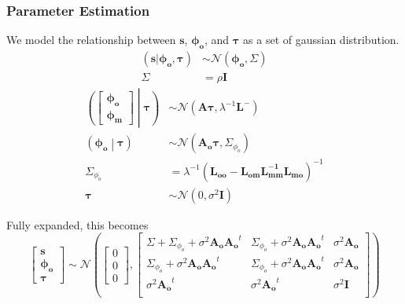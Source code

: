 \subsubsection{Parameter Estimation}
        We model the relationship between $\mathbf{s}$, $\mathbf{\phi_o}$, and
    $\mathbf{\tau}$ as a set of gaussian distribution.
    \begin{align}
        \left(\mathbf{s}|\mathbf{\phi_o}, \mathbf{\tau}\right) &\sim
            \mathcal{N}(\mathbf{\phi_o}, \Sigma)\\
        \Sigma &= \rho\mathbf{I}
    \end{align}
    \begin{align}
        \left(\begin{bmatrix}
            \mathbf{\phi_o}\\
            \mathbf{\phi_m}
        \end{bmatrix}\middle|\mathbf{\tau}\right) &\sim
            \mathcal{N}(\mathbf{A\tau}, \lambda^{-1}\mathbf{L}^-)\\
        \left(\mathbf{\phi_o}\middle|\mathbf{\tau}\right) &\sim
            \mathcal{N}\left(\mathbf{A_o}\mathbf{\tau}, \Sigma_{\phi_o}\right)\\
        \Sigma_{\phi_o} &= \lambda^{-1}\left(
            \mathbf{L_{oo}} - \mathbf{L_{om}L_{mm}^{-1}L_{mo}}\right)^{-1}\\
        \mathbf{\tau} &\sim \mathcal{N}\left(0, \sigma^2\mathbf{I}\right)
    \end{align}

    \noindent Fully expanded, this becomes
    \begin{equation}
        \begin{bmatrix}
            \mathbf{s}\\
            \mathbf{\phi_o}\\
            \mathbf{\tau}
        \end{bmatrix} \sim \mathcal{N}\left(
            \begin{bmatrix}0\\0\\0\end{bmatrix},
            \begin{bmatrix}
                \Sigma + \Sigma_{\phi_o} + \sigma^2\mathbf{A_oA_o}^t &
                \Sigma_{\phi_o} + \sigma^2\mathbf{A_oA_o}^t &
                \sigma^2\mathbf{A_o}\\
                \Sigma_{\phi_o} + \sigma^2\mathbf{A_oA_o}^t &
                \Sigma_{\phi_o} + \sigma^2\mathbf{A_oA_o}^t &
                \sigma^2\mathbf{A_o}\\
                \sigma^2\mathbf{A_o}^t & \sigma^2\mathbf{A_o}^t & \sigma^2\mathbf{I}\\
            \end{bmatrix}
        \right)\label{eqn:multivariate_gaussian_model}
    \end{equation}

